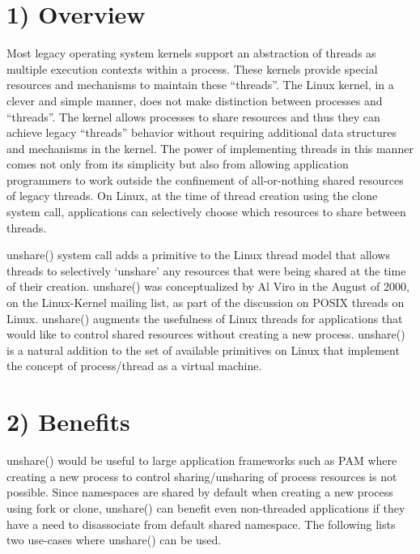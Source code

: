 \documentclass[a4paper,8pt,english]{sphinxmanual}
\begin{document}
\section{1) Overview}
\label{userspace-api/unshare:overview}
Most legacy operating system kernels support an abstraction of threads
as multiple execution contexts within a process. These kernels provide
special resources and mechanisms to maintain these ``threads''. The Linux
kernel, in a clever and simple manner, does not make distinction
between processes and ``threads''. The kernel allows processes to share
resources and thus they can achieve legacy ``threads'' behavior without
requiring additional data structures and mechanisms in the kernel. The
power of implementing threads in this manner comes not only from
its simplicity but also from allowing application programmers to work
outside the confinement of all-or-nothing shared resources of legacy
threads. On Linux, at the time of thread creation using the clone system
call, applications can selectively choose which resources to share
between threads.

unshare() system call adds a primitive to the Linux thread model that
allows threads to selectively `unshare' any resources that were being
shared at the time of their creation. unshare() was conceptualized by
Al Viro in the August of 2000, on the Linux-Kernel mailing list, as part
of the discussion on POSIX threads on Linux.  unshare() augments the
usefulness of Linux threads for applications that would like to control
shared resources without creating a new process. unshare() is a natural
addition to the set of available primitives on Linux that implement
the concept of process/thread as a virtual machine.


\section{2) Benefits}
\label{userspace-api/unshare:benefits}
unshare() would be useful to large application frameworks such as PAM
where creating a new process to control sharing/unsharing of process
resources is not possible. Since namespaces are shared by default
when creating a new process using fork or clone, unshare() can benefit
even non-threaded applications if they have a need to disassociate
from default shared namespace. The following lists two use-cases
where unshare() can be used.
\end{document}
